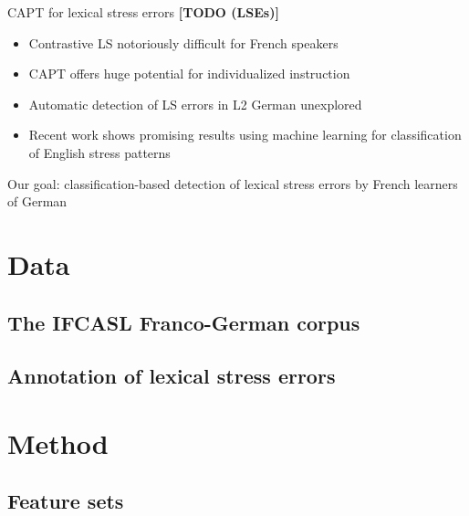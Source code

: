 \documentclass[xcolor={dvipsnames}]{beamer}
\newcommand{\TODO}[1]{{\color{red}\textbf{[TODO #1]}}}
\begin{document}
\begin{frame}{CAPT for lexical stress errors \TODO{(LSEs)}}
\begin{itemize}
\item{Contrastive LS notoriously difficult for French speakers%
}
\item{CAPT offers huge potential for individualized instruction}
\vfill
\item{Automatic detection of LS errors in L2 German unexplored}
\item{Recent work shows promising results using machine learning for classification of English stress patterns
}
\end{itemize}
\vfill
Our goal: classification-based detection of lexical stress errors by French learners of German
\end{frame}


\section{Data}
\subsection{The IFCASL Franco-German corpus}
\begin{frame}
\end{frame}
\subsection{Annotation of lexical stress errors}
\begin{frame}
\end{frame}

\section{Method}
\subsection{Feature sets}
\begin{frame}
\end{frame}
\end{document}
